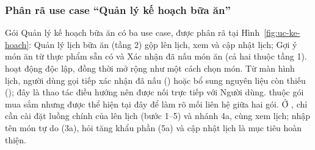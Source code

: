 \subsubsection{Phân rã use case “Quản lý kế hoạch bữa ăn”}\label{sssec:pr-ke-hoach}

Gói Quản lý kế hoạch bữa ăn có ba use case, được phân rã tại Hình~\ref{fig:uc-ke-hoach}:  Quản lý lịch bữa ăn (tầng 2) gộp lên lịch, xem và cập nhật lịch;  Gợi ý món ăn từ thực phẩm sẵn có và  Xác nhận đã nấu món ăn (cả hai thuộc tầng 1).  hoạt động độc lập, đồng thời mở rộng  như một cách chọn món. Từ màn hình lịch, người dùng gọi tiếp xác nhận đã nấu () hoặc bổ sung nguyên liệu còn thiếu (); đây là thao tác điều hướng nên được nối trực tiếp với Người dùng.  thuộc gói mua sắm nhưng được thể hiện tại đây để làm rõ mối liên hệ giữa hai gói. Ở , chỉ cần cài đặt luồng chính của lên lịch (bước 1--5) và nhánh 4a, cùng xem lịch; nhập tên món tự do (3a), hỏi tăng khẩu phần (5a) và cập nhật lịch là mục tiêu hoàn thiện.




